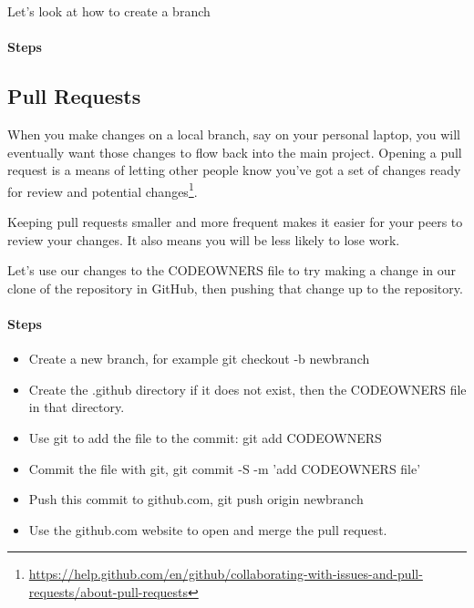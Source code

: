 Let's look at how to create a branch

\hypertarget{steps-3}{%
      \paragraph{Steps}\label{steps-3}}


\subsection{Pull Requests}

\justify
When you make changes on a local branch, say on your personal laptop,
you will eventually want those changes to flow back into the main
project. Opening a pull request is a means of letting other people know
you've got a set of changes ready for review and potential
changes\footnote{\url{https://help.github.com/en/github/collaborating-with-issues-and-pull-requests/about-pull-requests}}.

\justify
Keeping pull requests smaller and more frequent makes it easier for your
peers to review your changes. It also means you will be less likely to
lose work.

\justify
Let's use our changes to the CODEOWNERS file to try making a change in
our clone of the repository in GitHub, then pushing that change up to
the repository.

\hypertarget{steps-4}{%
      \paragraph{Steps}\label{steps-4}}

\begin{itemize}

      \item
            Create a new branch, for example git checkout -b newbranch
      \item
            Create the .github directory if it does not exist, then the CODEOWNERS
            file in that directory.
      \item
            Use git to add the file to the commit: git add CODEOWNERS
      \item
            Commit the file with git, git commit -S -m 'add CODEOWNERS file'
      \item
            Push this commit to github.com, git push origin newbranch
      \item
            Use the github.com website to open and merge the pull request.
\end{itemize}



